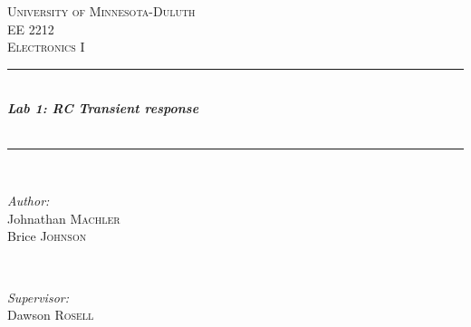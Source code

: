 \documentclass[10pt,a4paper]{article}
\begin{document}
\begin{titlepage}
\newcommand{\HRule}{\rule{\linewidth}{0.5mm}} %
\center %
\textsc{\LARGE University of Minnesota-Duluth}\\[1.5cm] %
\textsc{\Large EE 2212}\\[0.5cm] %
\textsc{\large Electronics I}\\[0.5cm] %
\HRule \\[0.4cm]
{ \huge \bfseries \emph{{\color{black}Lab 1: RC Transient response }}}\\[0.4cm] %
{\color{black}{\large \today}}\\
\HRule \\[1cm]


\begin{minipage}{0.4\textwidth}
\begin{flushleft} \large
\emph{Author:}\\
Johnathan \textsc{Machler}\\
Brice  \textsc{Johnson }
\end{flushleft}
\end{minipage}
~
\begin{minipage}{0.4\textwidth}
\begin{flushright} \large
\emph{Supervisor:} \\
Dawson \textsc{Rosell} %
\end{flushright}


\end{minipage}\\[1cm] %

\begin{abstract}
[200-300 words]
This lab will cover the fundamentals of RC circuits with one of two complimenting techniques. The purpose is to show the relationship between the behavior an RC circuit with impulse excitation. Various circuit concepts will be reexamined such as the transfer function.Both circuit in lab are duals of each other meaning that if put together port to port they would functionally cancel each other out. This goes along with the concepts learned in fundamental calculus like that the integral is an operation opposite to differentiation. These functional building blocks are critical analogues circuits that are much more complex in scale. And are vital to understanding many concepts within signal processing. To verify the results a three pronged approach will be implemented to show all forms of analysis converge on the same behavior. 
\end{abstract}
\vfill %
\end{titlepage}
\end{document}
